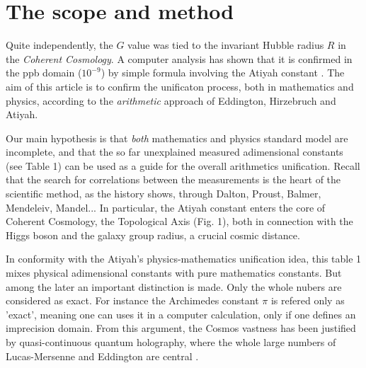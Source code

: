 \documentclass[preprint,12pt]{elsarticle}
\begin{document}
\label{}






\section{The scope and method}
   Quite independently, the $G$ value was tied to the invariant Hubble radius $R$ in the \textit {Coherent Cosmology}. A computer analysis has shown that it is confirmed in the ppb domain ($10^{-9}$) by simple formula involving the Atiyah constant \cite{Sanchez}. The aim of this article is to confirm the unificaton process, both in mathematics and physics, according to the \textit {arithmetic} approach of Eddington, Hirzebruch and Atiyah.
   
   Our main hypothesis is that \textit{both} mathematics and physics standard model are incomplete, and that the so far unexplained measured adimensional constants (see Table 1) can be used as a guide for the overall arithmetics unification. Recall that the search for correlations between the measurements is the heart of the scientific method, as the history shows, through Dalton, Proust, Balmer, Mendeleiv, Mandel... In particular, the Atiyah constant  enters the core of Coherent Cosmology, the Topological Axis (Fig. 1), both in connection with the Higgs boson and the galaxy group radius, a crucial cosmic distance.
   
   
   In conformity with the Atiyah's physics-mathematics unification idea, this table 1 mixes physical adimensional constants \cite{Tanabashi} with pure mathematics constants. But among the later an important distinction is made. Only the whole nubers are considered as exact. For instance the Archimedes constant $\pi$ is refered only as 'exact', meaning one can uses it in a computer calculation, only if one defines an imprecision domain. From this argument, the Cosmos vastness has been justified by  quasi-continuous quantum holography, where the whole large numbers of Lucas-Mersenne \cite{Bastin} and Eddington \cite{Eddington} are central \cite{Sanchez}.  
      
\end{document}
